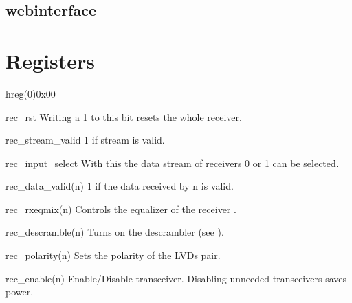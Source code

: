 \documentclass[11pt,technote,a4paper,onecolumn,dvips]{IEEEtran}
\begin{document}
\subsection{webinterface}


\clearpage
\appendices
\section{Registers}
\begin{register}{h}{reg(0)}{0x00}%
    \label{reg0}%
    \regnewline%
    \begin{regdesc}\begin{reglist}
        \item[rec\_rst] Writing a 1 to this bit resets the whole receiver.
        \item[rec\_stream\_valid] 1 if stream is valid.
        \item[rec\_input\_select] With this the data stream of receivers 0 or 1
            can be selected.
        \item[rec\_data\_valid(n)] 1 if the data received by n is valid.
        \item[rec\_rxeqmix(n)] Controls the equalizer of the receiver
            \cite[p. 165f]{gtx}.
        \item[rec\_descramble(n)] Turns on the descrambler (see
            ).
        \item[rec\_polarity(n)] Sets the polarity of the LVDs pair.
        \item[rec\_enable(n)] Enable/Disable transceiver. Disabling unneeded
            transceivers saves power.
    \end{reglist}\end{regdesc}
\end{register}
\end{document}
